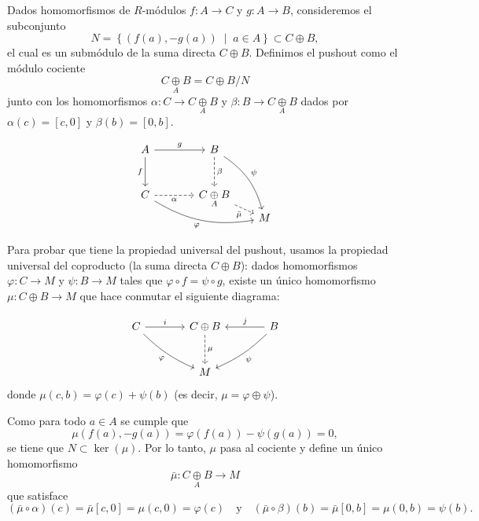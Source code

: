 \begin{ejemplo}\label{ej:pushout_R_modulo}
Dados homomorfismos de $R$-módulos $f \colon A \to C$ y $g \colon A \to B$, consideremos el subconjunto
\[
N = \left\{ (f(a), -g(a)) \;\middle|\; a \in A \right\} \subset C \oplus B,
\]
el cual es un submódulo de la suma directa $C \oplus B$. Definimos el pushout como el módulo cociente
\[
C \underset{A}{\oplus} B = {C \oplus B}/{N}
\]
junto con los homomorfismos $\alpha \colon C \to C \underset{A}{\oplus} B$ y $\beta \colon B \to C \underset{A}{\oplus} B$ dados por $\alpha(c) = [c, 0]$ y $\beta(b) = [0, b]$.

\[
\begin{tikzcd}[row sep=large, column sep=large]
A \arrow[r, "g"] \arrow[d, "f"'] & B \arrow[d, "\beta", dashed] \arrow[ddr, "\psi", bend left=20] &[-0.65cm] \\
C \arrow[r, "\alpha"', dashed] \arrow[rrd, "\varphi"', bend right=20] & C \underset{A}{\oplus} B \arrow[dr, "\bar{\mu}"', dashed] & \\[-1cm]
& & M
\end{tikzcd}
\]

Para probar que tiene la propiedad universal del pushout, usamos la propiedad universal del coproducto (la suma directa $C \oplus B$): dados homomorfismos $\varphi \colon C \to M$ y $\psi \colon B \to M$ tales que $\varphi \circ f = \psi \circ g$, existe un único homomorfismo $\mu \colon C \oplus B \to M$ que hace conmutar el siguiente diagrama:

\[
\begin{tikzcd}[row sep=large, column sep=large]
C \arrow[r, "i"] \arrow[dr, "\varphi"', bend right=10] & C \oplus B \arrow[d, "\mu", dashed] & B \arrow[l, "j"'] \arrow[dl, "\psi", bend left=10] \\
& M &
\end{tikzcd}
\]
donde $\mu(c, b) = \varphi(c) + \psi(b)$ (es decir, $\mu = \varphi \oplus \psi$). 

Como para todo $a \in A$ se cumple que
\[
\mu(f(a), -g(a)) = \varphi(f(a)) - \psi(g(a)) = 0,
\]
se tiene que $N \subset \ker(\mu)$. Por lo tanto, $\mu$ pasa al cociente y define un único homomorfismo
\[
\bar{\mu} \colon C \underset{A}{\oplus} B \longrightarrow M
\]
que satisface
\[
(\bar{\mu} \circ \alpha)(c) = \bar{\mu}[c, 0] = \mu(c, 0) = \varphi(c) \quad \text{y} \quad (\bar{\mu} \circ \beta)(b) = \bar{\mu}[0, b] = \mu(0, b) = \psi(b).
\]
\end{ejemplo}
